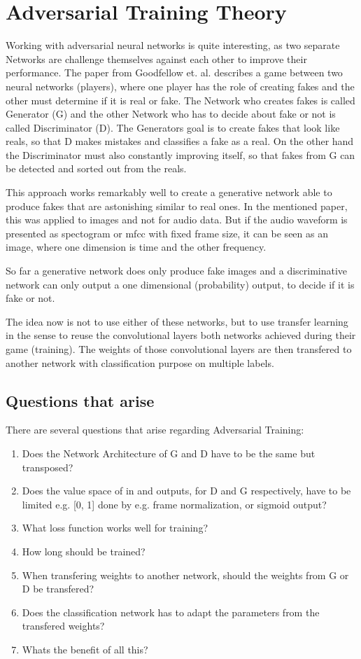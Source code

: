 
\section{Adversarial Training Theory}\label{sec:nn_adv}
Working with adversarial neural networks is quite interesting, as two separate Networks are challenge themselves against each other to improve their performance.
The paper from Goodfellow et. al. \cite{Goodfellow2014} describes a game between two neural networks (players), where one player has the role of creating fakes and the other must determine if it is real or fake.
The Network who creates fakes is called Generator (G) and the other Network who has to decide about fake or not is called Discriminator (D).
The Generators goal is to create fakes that look like reals, so that D makes mistakes and classifies a fake as a real.
On the other hand the Discriminator must also constantly improving itself, so that fakes from G can be detected and sorted out from the reals.

This approach works remarkably well to create a generative network able to produce fakes that are astonishing similar to real ones.
In the mentioned paper, this was applied to images and not for audio data.
But if the audio waveform is presented as spectogram or mfcc with fixed frame size, it can be seen as an image, where one dimension is time and the other frequency.

So far a generative network does only produce fake images and a discriminative network can only output a one dimensional (probability) output, to decide if it is fake or not.

The idea now is not to use either of these networks, but to use transfer learning in the sense to reuse the convolutional layers both networks achieved during their game (training).
The weights of those convolutional layers are then transfered to another network with classification purpose on multiple labels.

\subsection{Questions that arise}
There are several questions that arise regarding Adversarial Training:
\begin{enumerate}[label={Q.\textgoth{A}.\arabic*)}, leftmargin=1.4cm]
  \item Does the Network Architecture of G and D have to be the same but transposed?
  \item Does the value space of in and outputs, for D and G respectively, have to be limited e.g. [0, 1] done by e.g. frame normalization, or sigmoid output?
  \item What loss function works well for training?
  \item How long should be trained?
  \item When transfering weights to another network, should the weights from G or D be transfered?
  \item Does the classification network has to adapt the parameters from the transfered weights?
  \item Whats the benefit of all this?
\end{enumerate}

